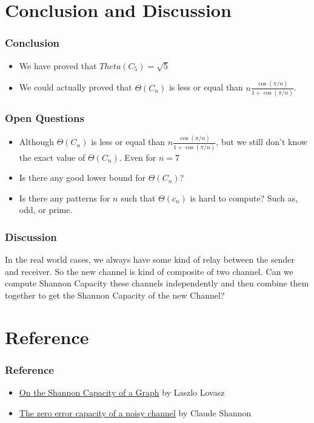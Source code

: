 \section{Conclusion and Discussion}

\begin{frame}
      \frametitle{Conclusion}
      \begin{itemize}
            \item We have proved that $Theta(C_{5}) = \sqrt{5}$
            \item We could actually proved that $\Theta(C_{n})$ is less or equal than $ n\frac{\cos(\pi/n)}{1+\cos(\pi/n)} $.
      \end{itemize}
\end{frame}

\begin{frame}
      \frametitle{Open Questions}
      \begin{itemize}
            \item Although $\Theta(C_{n})$ is less or equal than $ n\frac{\cos(\pi/n)}{1+\cos(\pi/n)} $, but we still don't know the exact value of $\Theta(C_{n})$. Even for $n=7$
            \item Is there any good lower bound for $\Theta(C_{n})$?
            \item Is there any patterns for $n$ such that $\Theta(c_{n})$ is hard to compute? Such as, odd, or prime.
      \end{itemize}
\end{frame}

\begin{frame}
      \frametitle{Discussion}

      In the real world cases, we always have some kind of relay between the sender and receiver. So the new channel is kind of composite of two channel. Can we compute Shannon Capacity these channels independently and then combine them together to get the Shannon Capacity of the new Channel?
\end{frame}

\section{Reference}

\begin{frame}
      \frametitle{Reference}
      \begin{itemize}
            \item \href{https://ieeexplore.ieee.org/stamp/stamp.jsp?arnumber=1055985}{On the Shannon Capacity of a Graph} by Laszlo Lovasz
            \item \href{https://ieeexplore.ieee.org/stamp/stamp.jsp?tp=&arnumber=1056798}{The zero error capacity of a noisy channel} by Claude Shannon
      \end{itemize}
\end{frame}